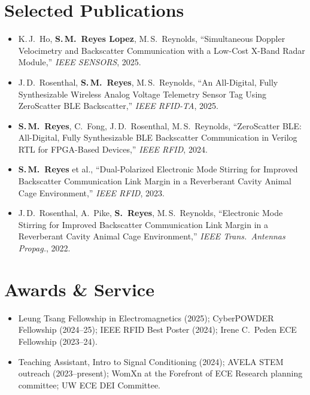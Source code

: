\documentclass[10pt,letterpaper]{article}
\newcommand{\me}[1]{\textbf{#1}}
\begin{document}
\section{Selected Publications}
\begin{itemize}
  \item K.\,J.\ Ho, \me{S.\,M.\ Reyes Lopez}, M.\,S.\ Reynolds, ``Simultaneous Doppler Velocimetry and Backscatter Communication with a Low-Cost X-Band Radar Module,'' \textit{IEEE SENSORS}, 2025.
  \item J.\,D.\ Rosenthal, \me{S.\,M.\ Reyes}, M.\,S.\ Reynolds, ``An All-Digital, Fully Synthesizable Wireless Analog Voltage Telemetry Sensor Tag Using ZeroScatter BLE Backscatter,'' \textit{IEEE RFID-TA}, 2025.
  \item \me{S.\,M.\ Reyes}, C.\ Fong, J.\,D.\ Rosenthal, M.\,S.\ Reynolds, ``ZeroScatter BLE: All-Digital, Fully Synthesizable BLE Backscatter Communication in Verilog RTL for FPGA-Based Devices,'' \textit{IEEE RFID}, 2024.
  \item \me{S.\,M.\ Reyes} et al., ``Dual-Polarized Electronic Mode Stirring for Improved Backscatter Communication Link Margin in a Reverberant Cavity Animal Cage Environment,'' \textit{IEEE RFID}, 2023.
  \item J.\,D.\ Rosenthal, A.\ Pike, \me{S.\ Reyes}, M.\,S.\ Reynolds, ``Electronic Mode Stirring for Improved Backscatter Communication Link Margin in a Reverberant Cavity Animal Cage Environment,'' \textit{IEEE Trans.\ Antennas Propag.}, 2022.
\end{itemize}

\section{Awards \& Service}
\begin{itemize}
  \item Leung Tsang Fellowship in Electromagnetics (2025); CyberPOWDER Fellowship (2024--25); IEEE RFID Best Poster (2024); Irene C.\ Peden ECE Fellowship (2023--24).
  \item Teaching Assistant, Intro to Signal Conditioning (2024); AVELA STEM outreach (2023--present); WomXn at the Forefront of ECE Research planning committee; UW ECE DEI Committee.
\end{itemize}
\end{document}
